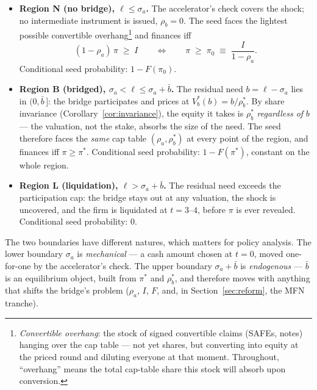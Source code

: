 \documentclass[11pt]{article}
\theoremstyle{definition}
\begin{document}
\begin{itemize}[itemsep=2pt, leftmargin=1.6em]
\item \textbf{Region N (no bridge), $\ell \le \sigma_a$.} The accelerator's check covers the shock; no intermediate instrument is issued, $\rho_b=0$. The seed faces the lightest possible convertible overhang\footnote{\emph{Convertible overhang}: the stock of signed convertible claims (SAFEs, notes) hanging over the cap table --- not yet shares, but converting into equity at the priced round and diluting everyone at that moment. Throughout, ``overhang'' means the total cap-table share this stock will absorb upon conversion.} and finances iff
\[
(1-\rho_a)\,\pi \;\ge\; I
\qquad\Longleftrightarrow\qquad
\pi \;\ge\; \pi_0 \;\equiv\; \frac{I}{1-\rho_a}.
\]
Conditional seed probability: $1-F(\pi_0)$.
\item \textbf{Region B (bridged), $\sigma_a < \ell \le \sigma_a + \bar b$.} The residual need $b=\ell-\sigma_a$ lies in $(0,\bar b\,]$: the bridge participates and prices at $V_b^{*}(b)=b/\rho_b^{*}$. By share invariance (Corollary~\ref{cor:invariance}), the equity it takes is $\rho_b^{*}$ \emph{regardless of} $b$ --- the valuation, not the stake, absorbs the size of the need. The seed therefore faces the \emph{same} cap table $(\rho_a, \rho_b^{*})$ at every point of the region, and finances iff $\pi \ge \pi^{*}$. Conditional seed probability: $1-F(\pi^{*})$, constant on the whole region.
\item \textbf{Region L (liquidation), $\ell > \sigma_a + \bar b$.} The residual need exceeds the participation cap: the bridge stays out at any valuation, the shock is uncovered, and the firm is liquidated at $t=3$--$4$, before $\pi$ is ever revealed. Conditional seed probability: $0$.
\end{itemize}

The two boundaries have different natures, which matters for policy analysis. The lower boundary $\sigma_a$ is \emph{mechanical} --- a cash amount chosen at $t=0$, moved one-for-one by the accelerator's check. The upper boundary $\sigma_a+\bar b$ is \emph{endogenous} --- $\bar b$ is an equilibrium object, built from $\pi^{*}$ and $\rho_b^{*}$, and therefore moves with anything that shifts the bridge's problem ($\rho_a$, $I$, $F$, and, in Section~\ref{sec:reform}, the MFN tranche).
\end{document}
